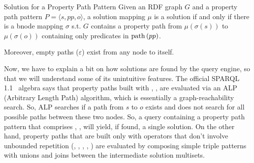\begin{definition}{Solution for a Property Path Pattern}
    Given an RDF graph \(G\) and a property path pattern \(P=\langle s, pp, o \rangle\), a solution mapping \(\mu\) is a solution if and only if there is a bnode mapping \(\sigma\) s.t. \(G\) contains a property path from \(\mu(\sigma(s))\) to \(\mu(\sigma(o))\) containing only predicates in \(\operatorname{path}\left(pp \right)\).
\end{definition}
Moreover, empty paths (\(\varepsilon\)) exist from any node to itself.

Now, we have to explain a bit on how solutions are found by the query engine, so that we will understand some of its unintuitive features.
The official SPARQL 1.1~\cite{sparql11} algebra says that property paths built with \code{*}, \code{+},  are evaluated via an ALP (Arbitrary Length Path) algorithm, which is essentially a graph-reachability search. So, ALP searches if a path from \(s\) to \(o\) exists and does not search for all possible paths between these two nodes. 
So, a query containing a property path pattern that comprises \code{*}, \code{+},  will yield, if found, a single solution.
On the other hand, property paths that are built only with operators that don't involve unbounded repetition (, \code{\textasciicircum}, \code{/}, \code{|}, \code{!}) are evaluated by composing simple triple patterns with unions and joins between the intermediate solution multisets.

